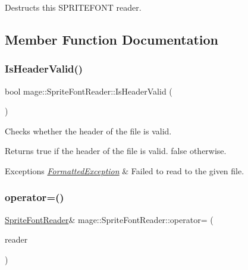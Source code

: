 Destructs this S\+P\+R\+I\+T\+E\+F\+O\+NT reader. 

\subsection{Member Function Documentation}
\hypertarget{classmage_1_1_sprite_font_reader_aa6dd3fc28e531d6db6ecda6ce3535d4c}{}\label{classmage_1_1_sprite_font_reader_aa6dd3fc28e531d6db6ecda6ce3535d4c} 
\subsubsection{\texorpdfstring{Is\+Header\+Valid()}{IsHeaderValid()}}
{\footnotesize\ttfamily bool mage\+::\+Sprite\+Font\+Reader\+::\+Is\+Header\+Valid (\begin{DoxyParamCaption}{ }\end{DoxyParamCaption})\hspace{0.3cm}{\ttfamily [private]}}

Checks whether the header of the file is valid.

\begin{DoxyReturn}{Returns}
{\ttfamily true} if the header of the file is valid. {\ttfamily false} otherwise. 
\end{DoxyReturn}

\begin{DoxyExceptions}{Exceptions}
{\em \hyperlink{structmage_1_1_formatted_exception}{Formatted\+Exception}} & Failed to read to the given file. \\
\hline
\end{DoxyExceptions}
\hypertarget{classmage_1_1_sprite_font_reader_a4de55b4bebfabb5f1c32078864baef11}{}\label{classmage_1_1_sprite_font_reader_a4de55b4bebfabb5f1c32078864baef11} 
\subsubsection{\texorpdfstring{operator=()}{operator=()}\hspace{0.1cm}{\footnotesize\ttfamily [1/2]}}
{\footnotesize\ttfamily \hyperlink{classmage_1_1_sprite_font_reader}{Sprite\+Font\+Reader}\& mage\+::\+Sprite\+Font\+Reader\+::operator= (\begin{DoxyParamCaption}\item[{const \hyperlink{classmage_1_1_sprite_font_reader}{Sprite\+Font\+Reader} \&}]{reader }\end{DoxyParamCaption})\hspace{0.3cm}{\ttfamily [delete]}}

